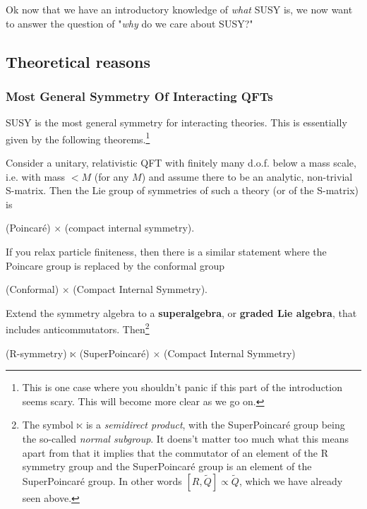Ok now that we have an introductory knowledge of \textit{what} SUSY is, we now want to answer the question of "\textit{why} do we care about SUSY?"

\subsection{Theoretical reasons}

\subsubsection{Most General Symmetry Of Interacting QFTs}

SUSY is the most general symmetry for interacting theories. This is essentially given by the following theorems.\footnote{This is one case where you shouldn't panic if this part of the introduction seems scary. This will become more clear as we go on.}

    Consider a unitary, relativistic QFT with finitely many d.o.f. below a mass scale, i.e. with mass $<M$ (for any $M$) and assume there to be an analytic, non-trivial S-matrix. Then the Lie group of symmetries of such a theory (or of the S-matrix) is 
    \begin{center}
        (Poincar\'{e}) $\times$ (compact internal symmetry).
    \end{center} 
\et

\br 
    If you relax particle finiteness, then there is a similar statement where the Poincare group is replaced by the conformal group
    \begin{center} 
    (Conformal) $\times$ (Compact Internal Symmetry).
    \end{center}
\er 

\label{thrm:HLS}
    Extend the symmetry algebra to a \textbf{superalgebra}, or \textbf{graded Lie algebra}, that includes anticommutators. Then\footnote{The symbol $\ltimes$ is a \textit{semidirect product}, with the SuperPoincar\'{e} group being the so-called \textit{normal subgroup}. It doens't matter too much what this means apart from that it implies that the commutator of an element of the R symmetry group and the SuperPoincar\'{e} group is an element of the SuperPoincar\'{e} group. In other words $[R,\widetilde{Q}] \propto \widetilde{Q}$, which we have already seen above.}
    \begin{center}
        (R-symmetry) $\ltimes$ (SuperPoincar\'{e}) $\times$ (Compact Internal Symmetry)
    \end{center}
\et 

